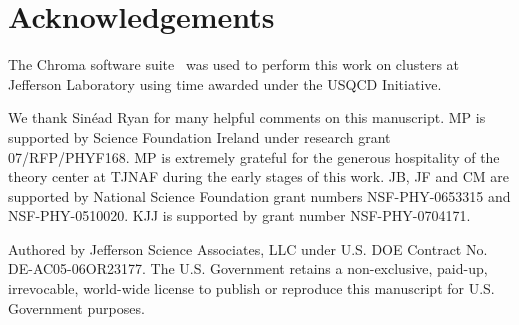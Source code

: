 \section*{Acknowledgements}

The Chroma software suite~\cite{Edwards:2004sx} was used to perform this work
on clusters at Jefferson Laboratory using time awarded under the USQCD
Initiative.

We thank Sin\'ead Ryan for many helpful comments on this manuscript.
MP is supported by Science Foundation Ireland under research grant
07/RFP/PHYF168.  MP is extremely grateful for the generous hospitality of the
theory center at TJNAF during the early stages of this work.
JB, JF and CM are supported by National Science Foundation grant numbers
NSF-PHY-0653315 and NSF-PHY-0510020.
KJJ is supported by grant number NSF-PHY-0704171.

Authored by Jefferson Science Associates, LLC under U.S. DOE Contract No.
DE-AC05-06OR23177. The U.S. Government retains a non-exclusive, paid-up,
irrevocable, world-wide license to publish or reproduce this manuscript for
U.S. Government purposes.

